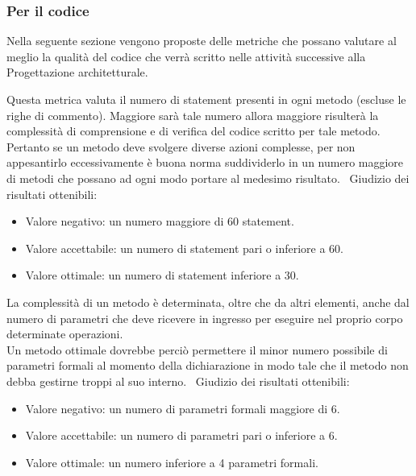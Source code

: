 \documentclass[a4paper, titlepage]{article}
\begin{document}
\subsubsection{Per il codice}
Nella seguente sezione vengono proposte delle metriche che possano valutare al meglio la qualità del codice che verrà scritto nelle attività successive alla Progettazione architetturale.

\label{par:statement}
Questa metrica valuta il numero di statement presenti in ogni metodo (escluse le righe di commento). Maggiore sarà tale numero allora maggiore risulterà la complessità di comprensione e di verifica del codice scritto per tale metodo. 
\\ Pertanto se un metodo deve svolgere diverse azioni complesse, per non appesantirlo eccessivamente è buona norma suddividerlo in un numero maggiore di metodi che possano ad ogni modo portare al medesimo risultato.
\
\newline Giudizio dei risultati ottenibili:
\begin{itemize}
\item Valore negativo: un numero maggiore di 60 statement.
\item Valore accettabile: un numero di statement pari o inferiore a 60. 
\item Valore ottimale: un numero di statement inferiore a 30.
\end{itemize}

La complessità di un metodo è determinata, oltre che da altri elementi, anche dal numero di parametri che deve ricevere in ingresso per eseguire nel proprio corpo determinate operazioni. 
\\ Un metodo ottimale dovrebbe perciò permettere il minor numero possibile di parametri formali al momento della dichiarazione in modo tale che il metodo non debba gestirne troppi al suo interno.
\
\newline Giudizio dei risultati ottenibili:
\begin{itemize}
\item Valore negativo: un numero di parametri formali maggiore di 6. 
\item Valore accettabile: un numero di parametri pari o inferiore a 6.
\item Valore ottimale: un numero inferiore a 4 parametri formali.
\end{itemize}
\end{document}
